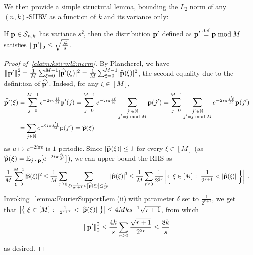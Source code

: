 We then provide a simple structural lemma, bounding the $L_2$ norm of any $(n,k)$-SIIRV as a function of $k$ and its variance only:
\begin{lemma}\label{claim:ksiirv:l2:norm}
  If $\mathbf{p} \in \mathcal{S}_{n, k}$ has variance $s^2$, then the distribution $\mathbf{p}'$ defined as $\mathbf{p}' \stackrel{\rm def}{=} \mathbf{p} \bmod M$ satisfies 
  $
      {\lVert\mathbf{p}'{\rVert}}_2 \leq \sqrt{\frac{8k}{s}}
  $.
\end{lemma}
\begin{proof}[Proof of~\cref{claim:ksiirv:l2:norm}]
By Plancherel, we have
$
  {\lVert\mathbf{p}'{\rVert}}_2^2 = \frac{1}{M} \sum_{\xi=0}^{M-1} \lvert \widehat{\mathbf{p}'}(\xi) \rvert^2 = \frac{1}{M} \sum_{\xi=0}^{M-1} \lvert \widehat{\mathbf{p}}(\xi) \rvert^2
$, 
the second equality due to the definition of $\widehat{\mathbf{p}'}$. Indeed, for any $\xi\in[M]$, 
\begin{align*}
    \widehat{\mathbf{p}'}(\xi) &= \sum_{j=0}^{M-1} e^{-2i\pi \frac{j\xi}{M}} \mathbf{p}'(j) = \sum_{j=0}^{M-1} e^{-2i\pi \frac{j\xi}{M}} \sum_{\substack{j'\in\mathbb{N}\\j' = j \bmod M}} \mathbf{p}(j')
    = \sum_{j=0}^{M-1} \sum_{\substack{j'\in\mathbb{N}\\j' = j \bmod M}} e^{-2i\pi \frac{j'\xi}{M}} \mathbf{p}(j')
    \\
    &= \sum_{j\in\mathbb{N}} e^{-2i\pi \frac{j'\xi}{M}} \mathbf{p}(j')
    = \widehat{\mathbf{p}}(\xi)
\end{align*}
as $u\mapsto e^{-2i\pi u}$ is $1$-periodic. Since $\left\lvert \widehat{\mathbf{p}}(\xi) \right\rvert\leq 1$ for every $\xi\in[M]$ (as $\widehat{\mathbf{p}}(\xi) = \mathbb{E}_{j\sim \mathbf{p}}[e^{-2i\pi \frac{j\xi}{M}}]$), we can upper bound the RHS as
\[
    \frac{1}{M} \sum_{\xi=0}^{M-1} \lvert \widehat{\mathbf{p}}(\xi) \rvert^2 \leq \frac{1}{M} \sum_{r\geq 0} \sum_{\xi : \frac{1}{2^{r+1}} < \left\lvert \widehat{\mathbf{p}}(\xi) \right\rvert \leq \frac{1}{2^{r}}} \left\lvert \widehat{\mathbf{p}}(\xi) \right\rvert^2
    \leq \frac{1}{M} \sum_{r\geq 0} \frac{1}{2^{2r}} \left\lvert \left\{\;  \xi\in[M]  \;\colon\;  \frac{1}{2^{r+1}} < \left\lvert \widehat{\mathbf{p}}(\xi) \right\rvert \; \right\} \right\rvert\;.
\]
Invoking~\cref{lemma:FourierSupportLem}(ii) with parameter $\delta$ set to $\frac{1}{2^{r+1}}$, we get that $\left\lvert \left\{\;  \xi\in[M]  \;\colon\;  \frac{1}{2^{r+1}} < \left\lvert \widehat{\mathbf{p}}(\xi) \right\rvert \; \right\} \right\rvert \leq 4Mk s^{-1} \sqrt{r+1}$, from which \[
    {\lVert\mathbf{p}'{\rVert}}_2^2 \leq \frac{4k}{s} \sum_{r\geq 0} \frac{\sqrt{r+1}}{2^{2r}} \leq \frac{8k}{s}
\]
as desired.
\end{proof}

